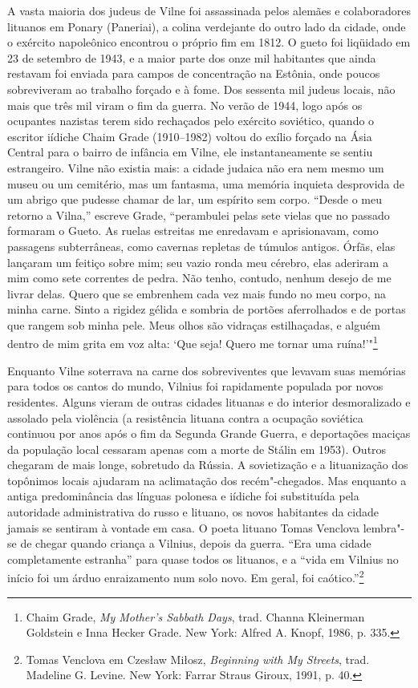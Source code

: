 A vasta maioria dos judeus de Vilne foi assassinada pelos alemães e
colaboradores lituanos em Ponary (Paneriai), a colina verdejante do
outro lado da cidade, onde o exército napoleônico encontrou o próprio
fim em 1812. O gueto foi liqüidado em 23 de setembro de 1943, e a maior
parte dos onze mil habitantes que ainda restavam foi enviada para campos
de concentração na Estônia, onde poucos sobreviveram ao trabalho forçado
e à fome. Dos sessenta mil judeus locais, não mais que três mil viram o
fim da guerra. No verão de 1944, logo após os ocupantes nazistas terem
sido rechaçados pelo exército soviético, quando o escritor iídiche Chaim
Grade (1910--1982) voltou do exílio forçado na Ásia Central para o bairro
de infância em Vilne, ele instantaneamente se sentiu estrangeiro. Vilne
não existia mais: a cidade judaica não era nem mesmo um museu ou um
cemitério, mas um fantasma, uma memória inquieta desprovida de um abrigo
que pudesse chamar de lar, um espírito sem corpo. ``Desde o meu retorno
a Vilna,'' escreve Grade, ``perambulei pelas sete vielas que no passado
formaram o Gueto. As ruelas estreitas me enredavam e aprisionavam, como
passagens subterrâneas, como cavernas repletas de túmulos antigos.
Órfãs, elas lançaram um feitiço sobre mim; seu vazio ronda meu cérebro,
elas aderiram a mim como sete correntes de pedra. Não tenho, contudo,
nenhum desejo de me livrar delas. Quero que se embrenhem cada vez mais
fundo no meu corpo, na minha carne. Sinto a rigidez gélida e sombria de
portões aferrolhados e de portas que rangem sob minha pele. Meus olhos
são vidraças estilhaçadas, e alguém dentro de mim grita em voz alta:
`Que seja! Quero me tornar uma ruína!'"\footnote{Chaim Grade, \emph{My
  Mother's Sabbath Days}, trad. Channa Kleinerman Goldstein e Inna
  Hecker Grade. New York: Alfred A. Knopf, 1986, p. 335.}

Enquanto Vilne soterrava na carne dos sobreviventes que levavam suas
memórias para todos os cantos do mundo, Vilnius foi rapidamente populada
por novos residentes. Alguns vieram de outras cidades lituanas e do
interior desmoralizado e assolado pela violência (a resistência lituana
contra a ocupação soviética continuou por anos após o fim da Segunda
Grande Guerra, e deportações maciças da população local cessaram apenas
com a morte de Stálin em 1953). Outros chegaram de mais longe, sobretudo
da Rússia. A sovietização e a lituanização dos topônimos locais ajudaram
na aclimatação dos recém"-chegados. Mas enquanto a antiga predominância
das línguas polonesa e iídiche foi substituída pela autoridade
administrativa do russo e lituano, os novos habitantes da cidade jamais
se sentiram à vontade em casa. O poeta lituano Tomas Venclova lembra"-se
de chegar quando criança a Vilnius, depois da guerra. ``Era uma cidade
completamente estranha'' para quase todos os lituanos, e a ``vida em
Vilnius no início foi um árduo enraizamento num solo novo. Em geral, foi
caótico.''\footnote{Tomas Venclova em Czesław Miłosz, \emph{Beginning
  with My Streets}, trad. Madeline G. Levine. New York: Farrar Straus
  Giroux, 1991, p. 40.}

